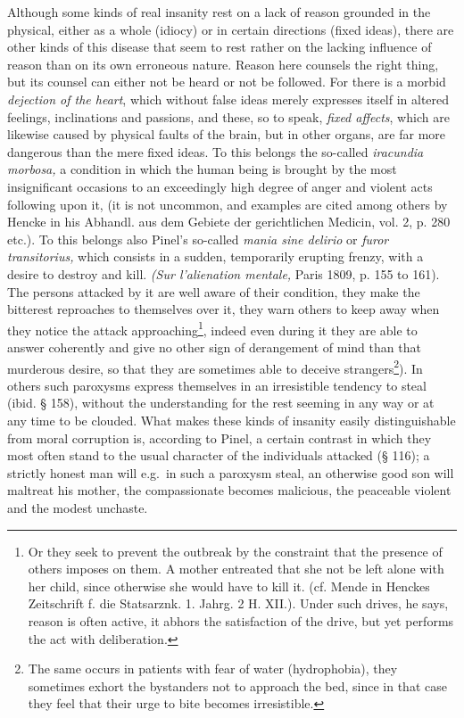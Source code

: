 \documentclass[12pt,a4paper,openany]{book}
\newcommand{\opage}[1]{\marginnote{\footnotesize\textit{[#1]}}}
\begin{document}
Although some kinds of real insanity rest on a lack of reason grounded in the
physical, either as a whole (idiocy) or in certain directions (fixed ideas), there
are other kinds of this disease that seem to rest rather on the lacking influence of
reason than on its own erroneous nature. Reason here counsels the right thing, but
its counsel can either not be heard or not be followed. For there is a morbid
\emph{dejection of the heart}, which without false ideas merely expresses itself in
altered feelings, inclinations and
\setcounter{footnote}{0}%
\opage{144}passions, and these, so to speak, \emph{fixed affects}, which are likewise caused by
physical faults of the brain, but in other organs, are far more dangerous than the
mere fixed ideas. To this belongs the so-called \textit{iracundia morbosa,} a
condition in which the human being is brought by the most insignificant occasions to
an exceedingly high degree of anger and violent acts following upon it, (it is not
uncommon, and examples are cited among others by Hencke in his Abhandl. aus dem
Gebiete der gerichtlichen Medicin, vol. 2, p. 280 etc.). To this belongs also Pinel's
so-called \textit{mania sine delirio} or \textit{furor transitorius,} which consists in
a sudden, temporarily erupting frenzy, with a desire to destroy and kill.
\textit{(Sur l'alienation mentale,} Paris 1809, p. 155 to 161). The persons attacked by
it are well aware of their condition, they make the bitterest reproaches to
themselves over it, they warn others to keep away when they notice the attack
approaching\footnote[1]{Or they seek to prevent the outbreak by the constraint that
the presence of others imposes on them. A mother entreated that she not be left alone
with her child, since otherwise she would have to kill it. (cf. Mende in Henckes
Zeitschrift f. die Statsarznk. 1. Jahrg. 2 H. XII.). Under such drives, he says,
reason is often active, it abhors the satisfaction of the drive, but yet performs the
act with deliberation.}, indeed even during it they are able to answer coherently and
give no other sign of derangement of mind than that murderous desire, so that they
are sometimes able to deceive strangers\footnote[2]{The same occurs in patients with
fear of water (hydrophobia), they sometimes exhort the bystanders not to approach the
bed, since in that case they feel that their urge to bite becomes irresistible.}). In
others such paroxysms express themselves in an irresistible tendency to steal (ibid.
§ 158), without the understanding for the rest seeming in any way or at any time to
be clouded. What makes these kinds of insanity easily distinguishable from moral
corruption is, according to Pinel, a certain contrast in which they most often stand
to the usual character of the individuals attacked (§ 116); a strictly honest man
will e.g.\ in such a paroxysm steal, an otherwise good son will maltreat his mother,
the
\setcounter{footnote}{0}%
\opage{145}compassionate becomes malicious, the peaceable violent and the modest unchaste.
\end{document}
